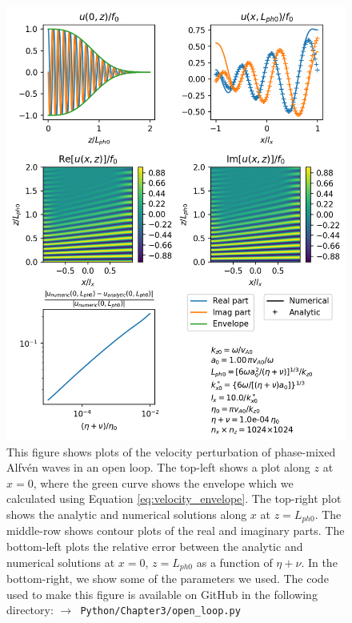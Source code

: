 \begin{figure}
    \centering
    \vspace{-20pt}
    \includegraphics[width=\textwidth,height=0.85\textheight,keepaspectratio]{figures/chapter03/phase_mixing_open_loop.png}
    \vspace{-10pt}
    \caption{This figure shows plots of the velocity perturbation of phase-mixed Alfv\'en waves in an open loop. The top-left shows a plot along $z$ at $x=0$, where the green curve shows the envelope which we calculated using Equation \eqref{eq:velocity_envelope}. The top-right plot shows the analytic and numerical solutions along $x$ at $z=L_{ph0}$. The middle-row shows contour plots of the real and imaginary parts. The bottom-left plots the relative error between the analytic and numerical solutions at $x=0$, $z=L_{ph0}$ as a function of $\eta+\nu$. In the bottom-right, we show some of the parameters we used. The code used to make this figure is available on GitHub in the following directory:\newline
    \texttt{$\rightarrow$ Python/Chapter3/open\_loop.py}}
    \vspace{-30pt}
    \label{fig:phase_mxing_open_loop}
\end{figure}

